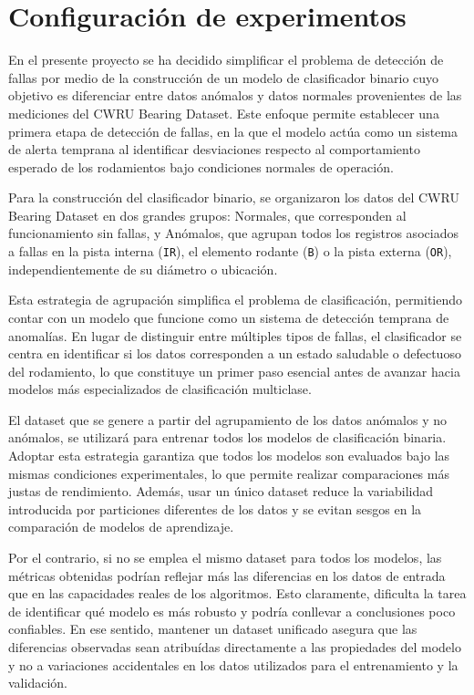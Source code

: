 \documentclass[11pt,a4paper,spanish]{book}
\numberwithin{equation}{chapter}
\numberwithin{figure}{chapter}
\begin{document}
\section{Configuración de experimentos}

En el presente proyecto se ha decidido simplificar el problema de detección de fallas 
por medio de la construcción de un modelo de clasificador binario cuyo objetivo es 
diferenciar entre datos anómalos y datos normales provenientes de las mediciones del 
CWRU Bearing Dataset. Este enfoque permite establecer una primera etapa de detección de 
fallas, en la que el modelo actúa como un sistema de alerta temprana al identificar 
desviaciones respecto al comportamiento esperado de los rodamientos bajo condiciones 
normales de operación.


Para la construcción del clasificador binario, se organizaron los datos del CWRU Bearing 
Dataset en dos grandes grupos: Normales, que corresponden al funcionamiento sin fallas, 
y Anómalos,  que agrupan todos los registros asociados a fallas en la pista interna 
(\texttt{IR}), el elemento rodante (\texttt{B}) o la pista externa (\texttt{OR}), 
independientemente de su diámetro o ubicación.


Esta estrategia de agrupación simplifica el problema de clasificación, permitiendo 
contar con un modelo que funcione como un sistema de detección temprana de anomalías. 
En lugar de distinguir entre múltiples tipos de fallas, el clasificador se centra en 
identificar si los datos corresponden a un estado saludable o defectuoso del rodamiento,
lo que constituye un primer paso esencial antes de avanzar hacia modelos más 
especializados de clasificación multiclase.


El dataset que se genere a partir del agrupamiento de los datos anómalos y no anómalos, 
se utilizará para entrenar todos los modelos de clasificación binaria. 
Adoptar esta estrategia garantiza que todos los modelos son evaluados bajo las mismas 
condiciones experimentales, lo que permite realizar comparaciones más justas de rendimiento. 
Además, usar un único dataset reduce la variabilidad introducida por particiones 
diferentes de los datos y se evitan sesgos en la comparación de modelos de aprendizaje.


Por el contrario, si no se emplea el mismo dataset para todos los modelos, las métricas 
obtenidas podrían reflejar más las diferencias en los datos de entrada que en las 
capacidades reales de los algoritmos. Esto claramente, dificulta la tarea de identificar 
qué modelo es más robusto y podría conllevar a conclusiones poco confiables. 
En ese sentido, mantener un dataset unificado asegura que las diferencias observadas 
sean atribuídas directamente a las propiedades del modelo y no a variaciones 
accidentales en los datos utilizados para el entrenamiento y la validación.
\end{document}
